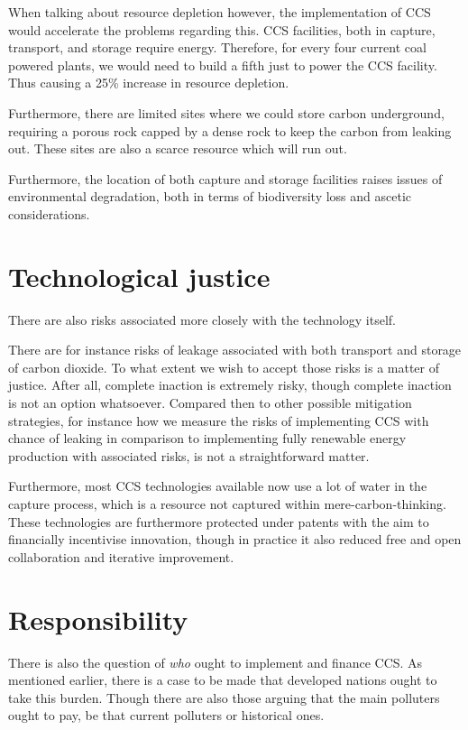 \documentclass[12pt]{report}
\begin{document}
When talking about resource depletion however, the implementation of CCS would
accelerate the problems regarding this. CCS facilities, both in capture,
transport, and storage require energy. Therefore, for every four current coal
powered plants, we would need to build a fifth just to power the CCS facility.
Thus causing a 25\% increase in resource depletion.

Furthermore, there are limited sites where we could store carbon underground,
requiring a porous rock capped by a dense rock to keep the carbon from leaking
out. These sites are also a scarce resource which will run out.

Furthermore, the location of both capture and storage facilities raises issues
of environmental degradation, both in terms of biodiversity loss and ascetic
considerations.

\section{Technological justice}

There are also risks associated more closely with the technology itself.

There are for instance risks of leakage associated with both transport and
storage of carbon dioxide. To what extent we wish to accept those risks is a
matter of justice. After all, complete inaction is extremely risky, though
complete inaction is not an option whatsoever. Compared then to other possible
mitigation strategies, for instance how we measure the risks of implementing CCS
with chance of leaking in comparison to implementing fully renewable energy
production with associated risks, is not a straightforward matter.

Furthermore, most CCS technologies available now use a lot of water in the
capture process, which is a resource not captured within mere-carbon-thinking.
These technologies are furthermore protected under patents with the aim to
financially incentivise innovation, though in practice it also reduced free and
open collaboration and iterative improvement.

\section{Responsibility}

There is also the question of \emph{who} ought to implement and finance CCS. As
mentioned earlier, there is a case to be made that developed nations ought to
take this burden. Though there are also those arguing that the main polluters
ought to pay, be that current polluters or historical ones.
\end{document}
